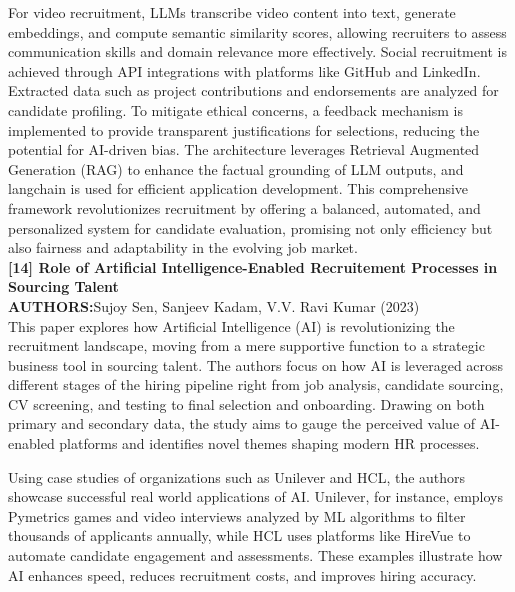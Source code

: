 \documentclass[a4paper, 12pt]{report}
\begin{document}
For video recruitment, LLMs transcribe video content into text, generate embeddings, and compute semantic similarity scores, allowing recruiters to assess communication skills and domain relevance more effectively. Social recruitment is achieved through API integrations with platforms like GitHub and LinkedIn. Extracted data such as project contributions and endorsements are analyzed for candidate profiling.
To mitigate ethical concerns, a feedback mechanism is implemented to provide transparent justifications for selections, reducing the potential for AI-driven bias. The architecture leverages Retrieval Augmented Generation (RAG) to enhance the factual grounding of LLM outputs, and langchain is used for efficient application development.
This comprehensive framework revolutionizes recruitment by offering a balanced, automated, and personalized system for candidate evaluation, promising not only efficiency but also fairness and adaptability in the evolving job market.\\
\noindent\textbf{[14] Role of Artificial Intelligence-Enabled Recruitement Processes in Sourcing Talent}\\
\textbf{AUTHORS:}Sujoy Sen, Sanjeev Kadam, V.V. Ravi Kumar (2023)\\
This paper explores how Artificial Intelligence (AI) is revolutionizing the recruitment landscape, moving from a mere supportive function to a strategic business tool in sourcing talent. The authors focus on how AI is leveraged across different stages of the hiring pipeline right from job analysis, candidate sourcing, CV screening, and testing to final selection and onboarding. Drawing on both primary and secondary data, the study aims to gauge the perceived value of AI-enabled platforms and identifies novel themes shaping modern HR processes.

Using case studies of organizations such as Unilever and HCL, the authors showcase successful real world applications of AI. Unilever, for instance, employs Pymetrics games and video interviews analyzed by ML algorithms to filter thousands of applicants annually, while HCL uses platforms like HireVue to automate candidate engagement and assessments. These examples illustrate how AI enhances speed, reduces recruitment costs, and improves hiring accuracy.
\end{document}
